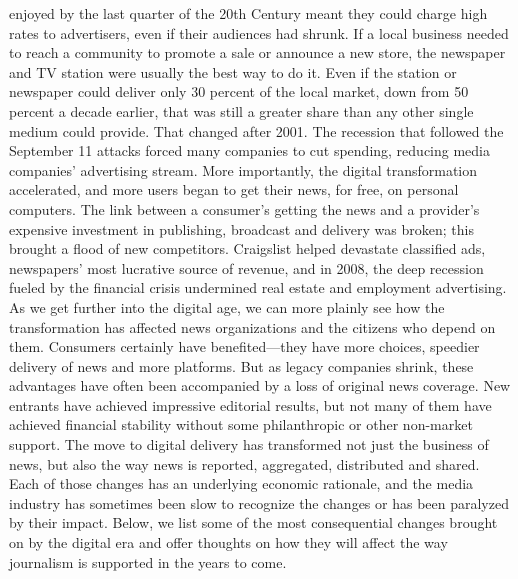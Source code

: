 enjoyed by the last quarter of the 20th Century meant they could charge
high rates to advertisers, even if their audiences had shrunk. If a local business
needed to reach a community to promote a sale or announce a new store, the
newspaper and TV station were usually the best way to do it. Even if the station
or newspaper could deliver only 30 percent of the local market, down from
50 percent a decade earlier, that was still a greater share than any other single
medium could provide.
That changed after 2001. The recession that followed the September 11 attacks
forced many companies to cut spending, reducing media companies' advertising
stream. More importantly, the digital transformation accelerated, and more users
began to get their news, for free, on personal computers. The link between
a consumer's getting the news and a provider's expensive investment in publishing,
broadcast and delivery was broken; this brought a flood of new competitors.
Craigslist helped devastate classified ads, newspapers' most lucrative source of revenue,
and in 2008, the deep recession fueled by the financial crisis undermined
real estate and employment advertising.
As we get further into the digital age, we can more plainly see how the transformation
has affected news organizations and the citizens who depend on them.
Consumers certainly have benefited—they have more choices, speedier delivery
of news and more platforms. But as legacy companies shrink, these advantages
have often been accompanied by a loss of original news coverage. New entrants
have achieved impressive editorial results, but not many of them have achieved
financial stability without some philanthropic or other non-market support.
The move to digital delivery has transformed not just the business of news, but
also the way news is reported, aggregated, distributed and shared. Each of those
changes has an underlying economic rationale, and the media industry has sometimes
been slow to recognize the changes or has been paralyzed by their impact.
Below, we list some of the most consequential changes brought on by the digital
era and offer thoughts on how they will affect the way journalism is supported
in the years to come.

